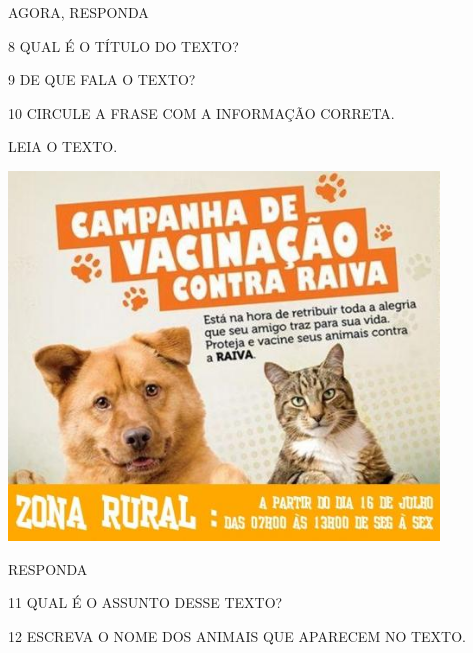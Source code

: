 AGORA, RESPONDA

\num{8} QUAL É O TÍTULO DO TEXTO?


\num{9} DE QUE FALA O TEXTO?


\num{10} CIRCULE A FRASE COM A INFORMAÇÃO CORRETA.

%
%
%
%

LEIA O TEXTO.

\includegraphics[width=4.50249in,height=3.85413in]{media/image165.jpg}


RESPONDA

\num{11} QUAL É O ASSUNTO DESSE TEXTO?


\num{12} ESCREVA O NOME DOS ANIMAIS QUE APARECEM NO TEXTO.



